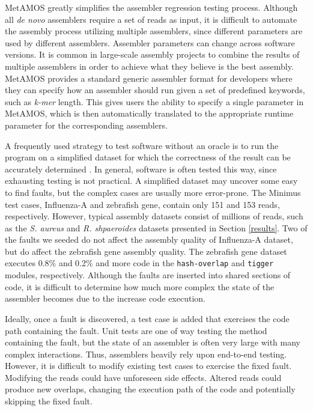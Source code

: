 MetAMOS greatly simplifies the assembler regression testing process.
Although all \emph{de novo} assemblers require a set of reads as input, it is difficult to automate the assembly process utilizing multiple assemblers, since different parameters are used by different assemblers.
Assembler parameters can change across software versions.
It is common in large-scale assembly projects to combine the results of multiple assemblers in order to achieve what they believe is the best assembly.
MetAMOS provides a standard generic assembler format for developers where they can specify how an assembler should run given a set of predefined keywords, such as \emph{k-mer} length.
This gives users the ability to specify a single parameter in MetAMOS, which is then automatically translated to the appropriate runtime parameter for the corresponding assemblers.


A frequently used strategy to test software without an oracle is to run the program on a simplified dataset for which the correctness of the result can be accurately determined \cite{weyuker1982testing}.
In general, software is often tested this way, since exhausting testing is not practical.
A simplified dataset may uncover some easy to find faults, but the complex cases are usually more error-prone.
The Minimus test cases, Influenza-A and zebrafish gene, contain only 151 and 153 reads, respectively.
However, typical assembly datasets consist of millions of reads, such as the \emph{S. aureus} and \emph{R. shpaeroides} datasets presented in Section \ref{results}.
Two of the faults we seeded do not affect the assembly quality of Influenza-A dataset, but do affect the zebrafish gene assembly quality.
The zebrafish gene dataset executes 0.8\% and 0.2\% and more code in the \texttt{hash-overlap} and \texttt{tigger} modules, respectively.
Although the faults are inserted into shared sections of code, it is difficult to determine how much more complex the state of the assembler becomes due to the increase code execution.

Ideally, once a fault is discovered, a test case is added that exercises the code path containing the fault.
Unit tests are one of way testing the method containing the fault, but the state of an assembler is often very large with many complex interactions.
Thus, assemblers heavily rely upon end-to-end testing.
However, it is difficult to modify existing test cases to exercise the fixed fault.
Modifying the reads %
could have unforeseen side effects.
Altered reads could produce new overlaps, changing the execution path of the code and potentially skipping the fixed fault.

